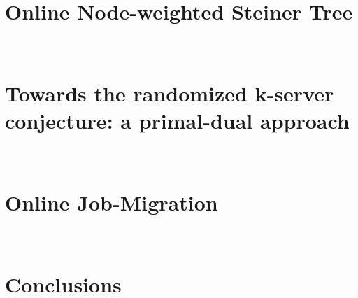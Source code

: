 \documentclass[10pt, twocolumn]{article}
\begin{document}
\section{Online Node-weighted Steiner Tree}
~\cite{naor11:node-weighted-steiner-tree}

\section{Towards the randomized k-server conjecture: a primal-dual approach}
~\cite{bansal10:k-server}

\section{Online Job-Migration}
~\cite{buchbinder11:job-migration} ~\cite{buchbinder11:job-migration-techreport}

\section{Conclusions}



\end{document}
